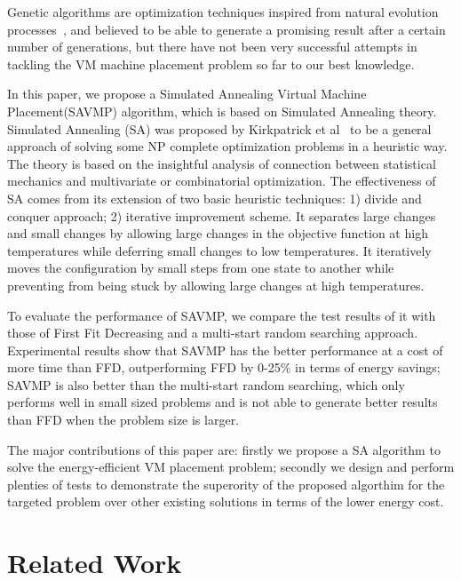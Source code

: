 \documentclass[10pt, conference, compsocconf]{IEEEtran}
\begin{document}
Genetic algorithms are optimization techniques inspired from natural
evolution processes~\cite{hertz00}, and  believed to be able to generate a
promising result after a certain number of generations, but there have not been very successful
attempts in tackling the VM machine placement problem so far to our best
knowledge.

In this paper, we propose a Simulated Annealing Virtual Machine Placement(SAVMP)
algorithm, which is based on Simulated Annealing theory.
Simulated Annealing (SA) was proposed by Kirkpatrick et al~\cite{kirkpatrick83}
to be a general approach of solving some NP complete optimization
problems in a heuristic way.
The theory is based on the insightful analysis of connection between statistical
mechanics and multivariate or combinatorial optimization. The effectiveness of
SA comes from its extension of two basic heuristic techniques: 1) divide and
conquer approach; 2) iterative improvement scheme. It separates large changes
and small changes by allowing large changes in the objective function at high
temperatures while deferring small changes to low temperatures. It iteratively
moves the configuration by small steps from one state to another while
preventing from being stuck by allowing large changes at high temperatures.

To evaluate the performance of SAVMP, we compare the test results of it with
those of First Fit Decreasing and a multi-start random searching approach.
Experimental results show that SAVMP has the better performance at a cost of
more time than FFD, outperforming FFD by 0-25\% in terms of energy savings;
SAVMP is also better than the multi-start random searching, which only performs well
in small sized problems and is not able to generate better results than FFD when the problem size is larger.

The major contributions of this paper are: firstly we propose a SA algorithm to
solve the energy-efficient VM placement problem; secondly we design and perform
plenties of tests to demonstrate the superority of the proposed algorthim for the targeted problem over other
existing solutions in terms of the lower energy cost.

\section{Related Work}
\end{document}
